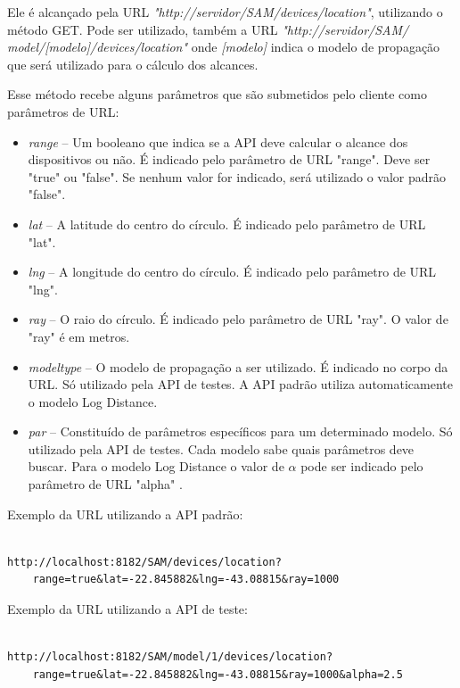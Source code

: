 Ele é alcançado pela URL \textit{"http://servidor/SAM/devices/location"}, utilizando o método GET. Pode ser utilizado, também a URL \textit{"http://servidor/SAM/ model/[modelo]/devices/location"} onde \textit{[modelo]} indica o modelo de propagação que será utilizado para o cálculo dos alcances.

Esse método recebe alguns parâmetros que são submetidos pelo cliente como parâmetros de URL:

\begin{itemize}
\item \textit{range} -- Um booleano que indica se a API deve calcular o alcance dos dispositivos ou não. É indicado pelo parâmetro de URL "range". Deve ser "true" ou "false". Se nenhum valor for indicado, será utilizado o valor padrão "false".
\item \textit{lat} -- A latitude do centro do círculo. É indicado pelo parâmetro de URL "lat".
\item \textit{lng} -- A longitude do centro do círculo. É indicado pelo parâmetro de URL "lng".
\item \textit{ray} -- O raio do círculo. É indicado pelo parâmetro de URL "ray". O valor de "ray" é em metros.
\item \textit{modeltype} -- O modelo de propagação a ser utilizado. É indicado no corpo da URL. Só utilizado pela API de testes. A API padrão utiliza automaticamente o modelo Log Distance.
\item \textit{par} -- Constituído de parâmetros específicos para um determinado modelo. Só utilizado pela API de testes. Cada modelo sabe quais parâmetros deve buscar. Para o modelo Log Distance o valor de \begin{math} \alpha \end{math} pode ser indicado pelo parâmetro de URL "alpha" .
\end{itemize}


Exemplo da URL utilizando a API padrão:

\begin{lstlisting}	

http://localhost:8182/SAM/devices/location?
	range=true&lat=-22.845882&lng=-43.08815&ray=1000

\end{lstlisting}

Exemplo da URL utilizando a API de teste:

\begin{lstlisting}			

http://localhost:8182/SAM/model/1/devices/location?
	range=true&lat=-22.845882&lng=-43.08815&ray=1000&alpha=2.5

\end{lstlisting}


